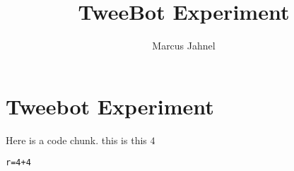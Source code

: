\documentclass[a4paper, landscape, 10pt, onesided, twocolumn]{scrreprt}\usepackage{graphicx, color}
\title{TweeBot Experiment}
\author{Marcus Jahnel}
\makeatletter
\newenvironment{kframe}{%
 \def\at@end@of@kframe{}%
 \ifinner\ifhmode%
  \def\at@end@of@kframe{\end{minipage}}%
  \begin{minipage}{\columnwidth}%
 \fi\fi%
 \def\FrameCommand##1{\hskip\@totalleftmargin \hskip-\fboxsep
 \colorbox{shadecolor}{##1}\hskip-\fboxsep
     \hskip-\linewidth \hskip-\@totalleftmargin \hskip\columnwidth}%
 \MakeFramed {\advance\hsize-\width
   \@totalleftmargin\z@ \linewidth\hsize
   \@setminipage}}%
 {\par\unskip\endMakeFramed%
 \at@end@of@kframe}
\newenvironment{knitrout}{}{} %
\makeatother
\begin{document}
\section*{Tweebot Experiment}

Here is a code chunk. this is this $4$ 

\begin{knitrout}
\color{fgcolor}\begin{kframe}
\begin{alltt}
r = 4 + 4
\end{alltt}
\end{kframe}
\end{knitrout}
\end{document}
